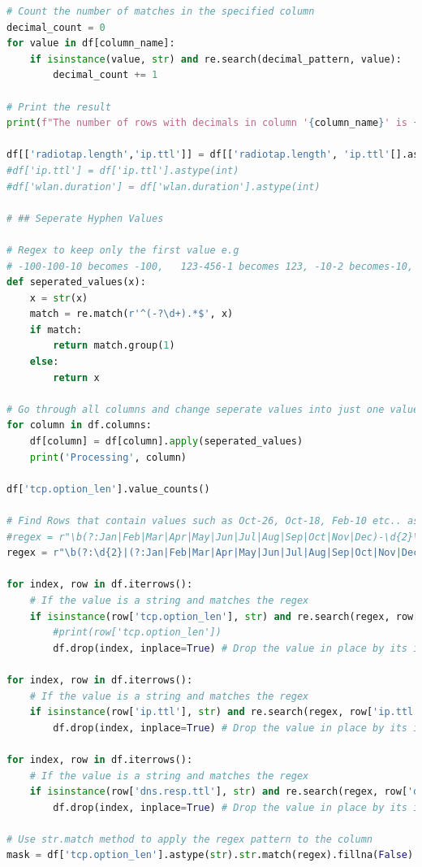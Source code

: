 \begin{appendices}
\begin{lstlisting}[language=Python]
# Count the number of matches in the specified column
decimal_count = 0
for value in df[column_name]:
    if isinstance(value, str) and re.search(decimal_pattern, value):
        decimal_count += 1

# Print the result
print(f"The number of rows with decimals in column '{column_name}' is {decimal_count}.")

df[['radiotap.length','ip.ttl']] = df[['radiotap.length', 'ip.ttl'[].astype(int)
#df['ip.ttl'] = df['ip.ttl'].astype(int)
#df['wlan.duration'] = df['wlan.duration'].astype(int)

# ## Seperate Hyphen Values

# Regex to keep only the first value e.g 
# -100-100-10 becomes -100,   123-456-1 becomes 123, -10-2 becomes-10, 81-63-63 becomes 81
def seperated_values(x):
    x = str(x)
    match = re.match(r'^(-?\d+).*$', x)
    if match:
        return match.group(1)
    else:
        return x

# Go through all columns and change seperate values into just one value
for column in df.columns:
    df[column] = df[column].apply(seperated_values)
    print('Processing', column)

df['tcp.option_len'].value_counts()

# Find Rows that contain values such as Oct-26, Oct-18, Feb-10 etc.. as these appear to be invalid and we will drop these rows.
#regex = r"\b(?:Jan|Feb|Mar|Apr|May|Jun|Jul|Aug|Sep|Oct|Nov|Dec)-\d{2}\b"
regex = r"\b(?:\d{2}|(?:Jan|Feb|Mar|Apr|May|Jun|Jul|Aug|Sep|Oct|Nov|Dec))-(?:\d{2}|(?:Jan|Feb|Mar|Apr|May|Jun|Jul|Aug|Sep|Oct|Nov|Dec))\b"

for index, row in df.iterrows():
    # If the value is a string and matches the regex
    if isinstance(row['tcp.option_len'], str) and re.search(regex, row['tcp.option_len']):
        #print(row['tcp.option_len'])
        df.drop(index, inplace=True) # Drop the value in place by its index

for index, row in df.iterrows():
    # If the value is a string and matches the regex
    if isinstance(row['ip.ttl'], str) and re.search(regex, row['ip.ttl']):
        df.drop(index, inplace=True) # Drop the value in place by its index

for index, row in df.iterrows():
    # If the value is a string and matches the regex
    if isinstance(row['dns.resp.ttl'], str) and re.search(regex, row['dns.resp.ttl']):
        df.drop(index, inplace=True) # Drop the value in place by its index

# Use str.match method to apply the regex pattern to the column
mask = df['tcp.option_len'].astype(str).str.match(regex).fillna(False)


\end{lstlisting}
\end{appendices}
